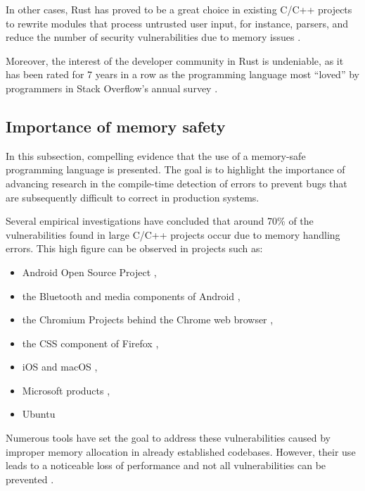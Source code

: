 In other cases, Rust has proved to be a great choice in existing C/C++ projects to rewrite modules
that process untrusted user input, for instance, parsers,
and reduce the number of security vulnerabilities due to memory issues \cite{chifflier2017writing}.

Moreover, the interest of the developer community in Rust is undeniable,
as it has been rated for 7 years in a row as the programming language most ``loved'' by programmers
in Stack Overflow's annual survey \cite{so-survey2022}.

\subsection{Importance of memory safety}

In this subsection, compelling evidence that the use of a memory-safe programming language is presented.
The goal is to highlight the importance of advancing research in the compile-time detection of errors
to prevent bugs that are subsequently difficult to correct in production systems.

Several empirical investigations have concluded that around 70\% of the vulnerabilities
found in large C/C++ projects occur due to memory handling errors.
This high figure can be observed in projects such as:

\begin{itemize}
      \item Android Open Source Project \cite{memory-bugs-android},
      \item the Bluetooth and media components of Android \cite{memory-bugs-android-media-bluetooth},
      \item the Chromium Projects behind the Chrome web browser \cite{memory-bugs-chrome},
      \item the CSS component of Firefox \cite{memory-bugs-firefox},
      \item iOS and macOS \cite{memory-bugs-ios-macos},
      \item Microsoft products \cite{miller-security-microsoft2019, memory-bugs-microsoft},
      \item Ubuntu \cite{memory-bugs-ubuntu}
\end{itemize}

Numerous tools have set the goal to address these vulnerabilities
caused by improper memory allocation in already established codebases.
However, their use leads to a noticeable loss of performance and
not all vulnerabilities can be prevented \cite{szekeres2013sok}.

